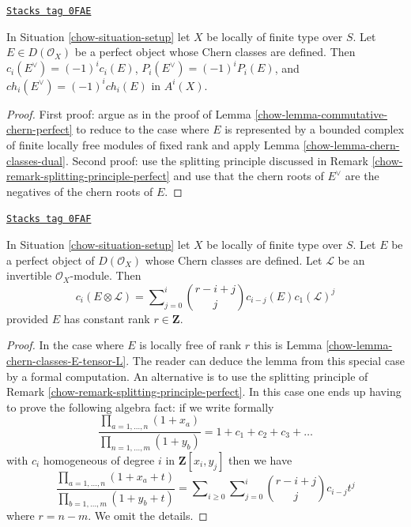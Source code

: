\begin{lemma}
\label{chow-lemma-chern-classes-perfect-dual}
\href{https://stacks.math.columbia.edu/tag/0FAE}{\texttt{Stacks tag 0FAE}}

In Situation \ref{chow-situation-setup} let $X$ be locally of finite type over $S$.
Let $E \in D(\mathcal{O}_X)$ be a perfect object whose Chern classes are
defined. Then $c_i(E^\vee) = (-1)^i c_i(E)$, $P_i(E^\vee) = (-1)^iP_i(E)$,
and $ch_i(E^\vee) = (-1)^ich_i(E)$ in $A^i(X)$.
\end{lemma}

\begin{proof}

First proof: argue as in the proof of
Lemma \ref{chow-lemma-commutative-chern-perfect}
to reduce to the case where $E$ is represented
by a bounded complex of finite locally free modules
of fixed rank and apply Lemma \ref{chow-lemma-chern-classes-dual}.
Second proof: use the splitting principle discussed
in Remark \ref{chow-remark-splitting-principle-perfect}
and use that the chern roots of $E^\vee$ are the negatives
of the chern roots of $E$.
\end{proof}

\begin{lemma}
\label{chow-lemma-chern-class-perfect-tensor-invertible}
\href{https://stacks.math.columbia.edu/tag/0FAF}{\texttt{Stacks tag 0FAF}}

In Situation \ref{chow-situation-setup} let $X$ be locally of finite type over $S$.
Let $E$ be a perfect object of $D(\mathcal{O}_X)$ whose Chern classes
are defined.
Let $\mathcal{L}$ be an invertible $\mathcal{O}_X$-module. Then
$$
c_i(E \otimes \mathcal{L}) =
\sum\nolimits_{j = 0}^i
\binom{r - i + j}{j} c_{i - j}(E) c_1(\mathcal{L})^j
$$
provided $E$ has constant rank $r \in \mathbf{Z}$.
\end{lemma}

\begin{proof}

In the case where $E$ is locally free of rank $r$ this is
Lemma \ref{chow-lemma-chern-classes-E-tensor-L}. The reader can deduce
the lemma from this special case by a formal computation.
An alternative is to use the splitting principle of
Remark \ref{chow-remark-splitting-principle-perfect}.
In this case one ends up having to prove the following
algebra fact: if we write formally
$$
\frac{\prod_{a = 1, \ldots, n} (1 + x_a)}{\prod_{n = 1, \ldots, m} (1 + y_b)}
= 1 + c_1 + c_2 + c_3 + \ldots
$$
with $c_i$ homogeneous of degree $i$
in $\mathbf{Z}[x_i, y_j]$ then we have
$$
\frac{\prod_{a = 1, \ldots, n} (1 + x_a + t)}{\prod_{b = 1, \ldots, m} (1 + y_b + t)}
= \sum\nolimits_{i \geq 0} \sum\nolimits_{j = 0}^i
\binom{r - i + j}{j} c_{i - j} t^j
$$
where $r = n - m$. We omit the details.
\end{proof}

